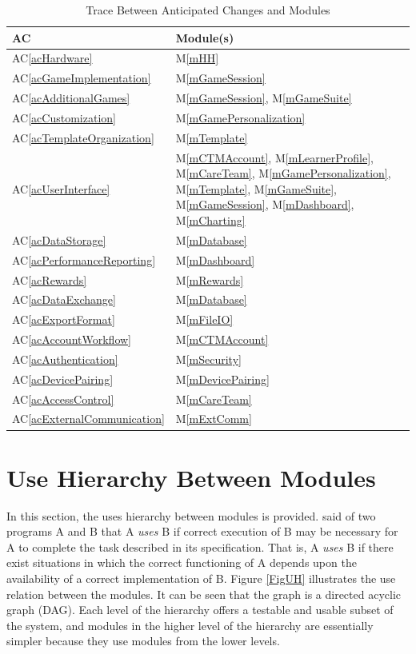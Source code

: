 \documentclass[12pt, titlepage]{article}
\newcommand{\acref}[1]{AC\ref{#1}}
\newcommand{\mref}[1]{M\ref{#1}}
\begin{document}
\begin{table}[H]
\centering
\begin{tabular}{p{} p{}}
\toprule
\textbf{AC} & \textbf{Module(s)}\\
\midrule
\acref{acHardware} & \mref{mHH}\\
\acref{acGameImplementation} & \mref{mGameSession}\\
\acref{acAdditionalGames} & \mref{mGameSession}, \mref{mGameSuite}\\
\acref{acCustomization} & \mref{mGamePersonalization}\\
\acref{acTemplateOrganization} & \mref{mTemplate}\\
\acref{acUserInterface} & \mref{mCTMAccount}, \mref{mLearnerProfile}, \mref{mCareTeam}, \mref{mGamePersonalization}, \mref{mTemplate}, \mref{mGameSuite}, \mref{mGameSession}, \mref{mDashboard}, \mref{mCharting}\\
\acref{acDataStorage} & \mref{mDatabase}\\
\acref{acPerformanceReporting} & \mref{mDashboard}\\
\acref{acRewards} & \mref{mRewards}\\
\acref{acDataExchange} & \mref{mDatabase}\\
\acref{acExportFormat} & \mref{mFileIO}\\
\acref{acAccountWorkflow} & \mref{mCTMAccount}\\
\acref{acAuthentication} & \mref{mSecurity}\\
\acref{acDevicePairing} & \mref{mDevicePairing}\\
\acref{acAccessControl} & \mref{mCareTeam}\\
\acref{acExternalCommunication} & \mref{mExtComm}\\
\bottomrule
\end{tabular}
\caption{Trace Between Anticipated Changes and Modules}
\label{TblACT}
\end{table}

\section{Use Hierarchy Between Modules} \label{SecUse}

In this section, the uses hierarchy between modules is
provided. \citet{Parnas1978} said of two programs A and B that A {\em uses} B if
correct execution of B may be necessary for A to complete the task described in
its specification. That is, A {\em uses} B if there exist situations in which
the correct functioning of A depends upon the availability of a correct
implementation of B.  Figure \ref{FigUH} illustrates the use relation between
the modules. It can be seen that the graph is a directed acyclic graph
(DAG). Each level of the hierarchy offers a testable and usable subset of the
system, and modules in the higher level of the hierarchy are essentially simpler
because they use modules from the lower levels.
\end{document}
